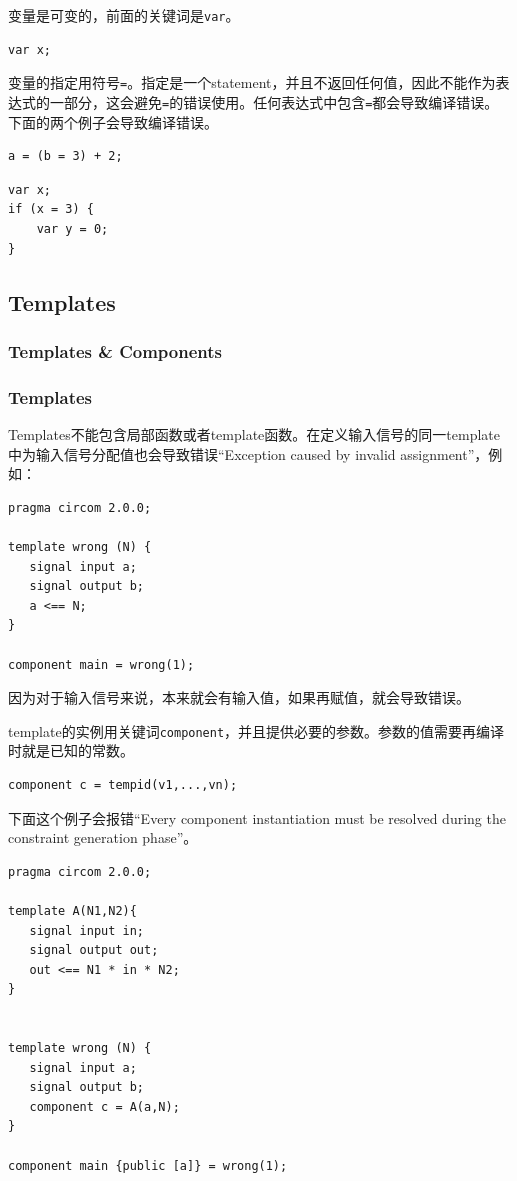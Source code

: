 \documentclass[10pt]{ctexart}
\begin{document}
变量是可变的，前面的关键词是\verb|var|。
\begin{lstlisting}
var x;
\end{lstlisting}
变量的指定用符号\verb|=|。指定是一个statement，并且不返回任何值，因此不能作为表达式的一部分，这会避免\verb|=|的错误使用。任何表达式中包含\verb|=|都会导致编译错误。下面的两个例子会导致编译错误。

\begin{lstlisting}
a = (b = 3) + 2;
\end{lstlisting}
\begin{lstlisting}
var x;
if (x = 3) {
	var y = 0;
}
\end{lstlisting}

\subsection{Templates}
\subsubsection{Templates \& Components}
\subsubsection*{Templates}
Templates不能包含局部函数或者template函数。在定义输入信号的同一template中为输入信号分配值也会导致错误“Exception caused by invalid assignment”，例如：
\begin{lstlisting}
pragma circom 2.0.0;

template wrong (N) {
   signal input a;
   signal output b;
   a <== N;
}

component main = wrong(1);	
\end{lstlisting}
因为对于输入信号来说，本来就会有输入值，如果再赋值，就会导致错误。

template的实例用关键词\verb|component|，并且提供必要的参数。参数的值需要再编译时就是已知的常数。
\begin{lstlisting}
component c = tempid(v1,...,vn);
\end{lstlisting}
下面这个例子会报错“Every component instantiation must be resolved during the constraint generation phase”。
\begin{lstlisting}
pragma circom 2.0.0;

template A(N1,N2){
   signal input in;
   signal output out; 
   out <== N1 * in * N2;
}


template wrong (N) {
   signal input a;
   signal output b;
   component c = A(a,N); 
}

component main {public [a]} = wrong(1);
\end{lstlisting}
\end{document}
